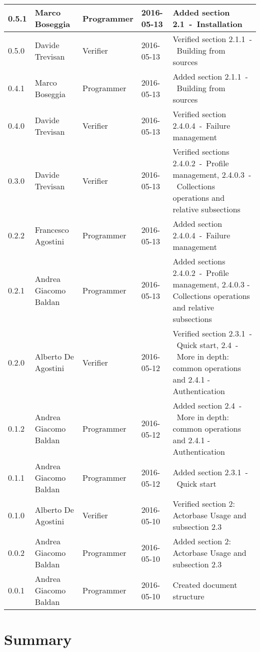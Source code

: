 \documentclass{scalatekids-article}
\begin{document}
\begin{center}
\begin{longtable}{| l | l | l | l | p{5cm} |}
    \hline
    0.5.1 & Marco Boseggia & Programmer & 2016-05-13 & Added section 2.1\ -\ Installation\\
    \hline
    0.5.0 & Davide Trevisan & Verifier & 2016-05-13 & Verified section 2.1.1\ -\ Building from sources\\
    \hline
    0.4.1 & Marco Boseggia & Programmer & 2016-05-13 & Added section 2.1.1\ -\ Building from sources\\
    \hline
    0.4.0 & Davide Trevisan & Verifier & 2016-05-13 & Verified section 2.4.0.4\ -\ Failure management\\
    \hline
    0.3.0 & Davide Trevisan & Verifier & 2016-05-13 & Verified sections 2.4.0.2\ -\ Profile management, 2.4.0.3\ -\ Collections operations and relative subsections\\
    \hline
    0.2.2 & Francesco Agostini & Programmer & 2016-05-13 & Added section 2.4.0.4\ -\ Failure management\\
    \hline
    0.2.1 & Andrea Giacomo Baldan & Programmer & 2016-05-13 & Added sections 2.4.0.2\ -\ Profile management, 2.4.0.3 - Collections operations and relative subsections\\
    \hline
    0.2.0 & Alberto De Agostini & Verifier & 2016-05-12 & Verified section 2.3.1\ -\ Quick start, 2.4\ -\ More in depth: common operations and 2.4.1 - Authentication\\
    \hline
    0.1.2 & Andrea Giacomo Baldan & Programmer & 2016-05-12 & Added section 2.4\ -\ More in depth: common operations and 2.4.1 - Authentication\\
    \hline
    0.1.1 & Andrea Giacomo Baldan & Programmer & 2016-05-12 & Added section 2.3.1\ -\ Quick start\\
    \hline
    0.1.0 & Alberto De Agostini & Verifier & 2016-05-10 & Verified section 2: Actorbase Usage and subsection 2.3\\
    \hline
    0.0.2 & Andrea Giacomo Baldan & Programmer & 2016-05-10 & Added section 2: Actorbase Usage and subsection 2.3\\
    \hline
    0.0.1 & Andrea Giacomo Baldan & Programmer & 2016-05-10 & Created document structure\\
    \hline
  \end{longtable}
\end{center}
\tableofcontents
\newpage
{}
\section{Summary}
\end{document}
